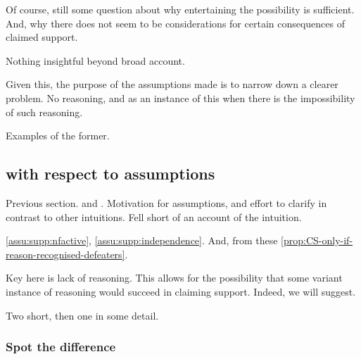 \begin{note}
  Of course, still some question about why entertaining the possibility is sufficient.
  And, why there does not seem to be considerations for certain consequences of claimed support.

  Nothing insightful beyond broad account.

  Given this, the purpose of the assumptions made is to narrow down a clearer problem.
  No reasoning, and as an instance of this when there is the impossibility of such reasoning.

  Examples of the former.
\end{note}

\subsection{ with respect to assumptions}
\label{sec:illustrations-wrt-assumption}

\begin{note}
  Previous section.
  \ideaCSA{} and \ideaCSB{}.
  Motivation for assumptions, and effort to clarify in contrast to other intuitions.
  Fell short of an account of the intuition.

  \autoref{assu:supp:nfactive}, \autoref{assu:supp:independence}.
  And, from these \autoref{prop:CS-only-if-reason-recognised-defeaters}.

  Key here is lack of reasoning.
  This allows for the possibility that some variant instance of reasoning would succeed in claiming support.
  Indeed, we will suggest.
\end{note}

\begin{note}
  Two short, then one in some detail.
\end{note}

\subsubsection{Spot the difference}

